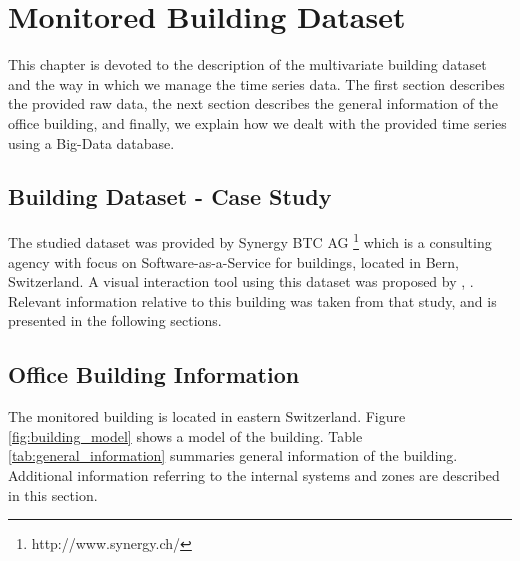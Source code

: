 \chapter{Monitored Building Dataset} %
\label{Chapter3} %
\minitoc



This chapter is devoted to the description of the multivariate building dataset and the way in which we manage the time series data. The first section describes the provided raw data, the next section describes the general information of the office building, and finally, we explain how we dealt with the provided time series using a Big-Data database.


\section{Building Dataset - Case Study}

The studied dataset was provided by Synergy BTC AG \footnote{http://www.synergy.ch/} which is a consulting agency with focus on Software-as-a-Service for buildings, located in Bern, Switzerland. A visual interaction tool using this dataset was proposed by \citeauthor{roman2015}, \citeyear{roman2015} \cite{roman2015}. Relevant information relative to this building was taken from that study, and is presented in the following sections. 

\section{Office Building Information}   
\label{general_information}

The monitored building is located in eastern Switzerland. Figure \ref{fig:building_model} shows a model of the building. Table \ref{tab:general_information} summaries general information of the building. Additional information referring to the internal systems and zones are described in this section.  

